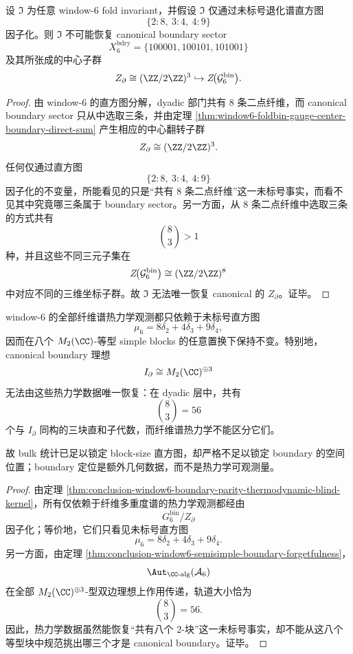\begin{theorem}\label{thm:conclusion-window6-boundary-parity-histogram-nonrecoverability}
设 \(\mathfrak I\) 为任意 window-\(6\) fold invariant，并假设 \(\mathfrak I\) 仅通过未标号退化谱直方图
\[
\{2:8,\ 3:4,\ 4:9\}
\]
因子化。则 \(\mathfrak I\) 不可能恢复 canonical boundary sector
\[
X_6^{\mathrm{bdry}}=\{100001,100101,101001\}
\]
及其所张成的中心子群
\[
Z_{\partial}\cong (\ZZ/2\ZZ)^3\hookrightarrow Z\!\bigl(\mathcal G_6^{\mathrm{bin}}\bigr).
\]
\end{theorem}
\begin{proof}
由 window-\(6\) 的直方图分解，dyadic 部门共有 \(8\) 条二点纤维，而 canonical boundary sector 只从中选取三条，并由定理 \ref{thm:window6-foldbin-gauge-center-boundary-direct-sum} 产生相应的中心翻转子群
\[
Z_{\partial}\cong (\ZZ/2\ZZ)^3.
\]
任何仅通过直方图
\[
\{2:8,\ 3:4,\ 4:9\}
\]
因子化的不变量，所能看见的只是“共有 \(8\) 条二点纤维”这一未标号事实，而看不见其中究竟哪三条属于 boundary sector。另一方面，从 \(8\) 条二点纤维中选取三条的方式共有
\[
\binom{8}{3}>1
\]
种，并且这些不同三元子集在
\[
Z\!\bigl(\mathcal G_6^{\mathrm{bin}}\bigr)\cong (\ZZ/2\ZZ)^8
\]
中对应不同的三维坐标子群。故 \(\mathfrak I\) 无法唯一恢复 canonical 的 \(Z_{\partial}\)。证毕。
\end{proof}

\begin{corollary}\label{cor:conclusion-window6-canonical-boundary-ideal-thermodynamic-localization-invisibility}
window-\(6\) 的全部纤维谱热力学观测都只依赖于未标号直方图
\[
\mu_6=8\delta_2+4\delta_3+9\delta_4,
\]
因而在八个 \(M_2(\CC)\)-等型 simple blocks 的任意置换下保持不变。特别地，canonical boundary 理想
\[
I_{\partial}\cong M_2(\CC)^{\oplus 3}
\]
无法由这些热力学数据唯一恢复：在 dyadic 层中，共有
\[
\binom{8}{3}=56
\]
个与 \(I_{\partial}\) 同构的三块直和子代数，而纤维谱热力学不能区分它们。

故 bulk 统计已足以锁定 block-size 直方图，却严格不足以锁定 boundary 的空间位置；boundary 定位是额外几何数据，而不是热力学可观测量。
\end{corollary}

\begin{proof}
由定理 \ref{thm:conclusion-window6-boundary-parity-thermodynamic-blind-kernel}，所有仅依赖于纤维多重度谱的热力学观测都经由
\[
G_6^{\mathrm{bin}}/Z_{\partial}
\]
因子化；等价地，它们只看见未标号直方图
\[
\mu_6=8\delta_2+4\delta_3+9\delta_4.
\]
另一方面，由定理 \ref{thm:conclusion-window6-semisimple-boundary-forgetfulness}，
\[
\Aut_{\CC\text{-alg}}(\mathcal A_6)
\]
在全部 \(M_2(\CC)^{\oplus 3}\)-型双边理想上作用传递，轨道大小恰为
\[
\binom{8}{3}=56.
\]
因此，热力学数据虽然能恢复“共有八个 \(2\)-块”这一未标号事实，却不能从这八个等型块中规范挑出哪三个才是 canonical boundary。证毕。
\end{proof}

